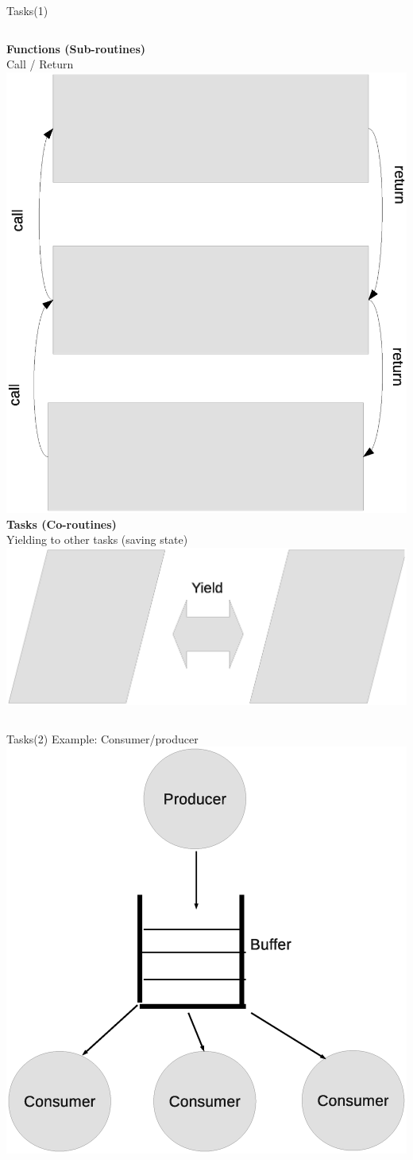 \documentclass{beamer}
\begin{document}
	\begin{frame}{Tasks(1)}
		\begin{columns}[c]
				\textbf{Functions (Sub-routines)} \\
				Call / Return
				\includegraphics[width = .6\textwidth]{figures/functions.eps}
				\textbf{Tasks (Co-routines)} \\
				Yielding to other tasks (saving state) \\
				\includegraphics[width = .6\textwidth]{figures/tasks.eps}
		\end{columns}
	\end{frame}

	\begin{frame}{Tasks(2)}
		Example: Consumer/producer 
		\includegraphics[width=.6\textwidth]{figures/consume_produce.eps}
	\end{frame}	
\end{document}
